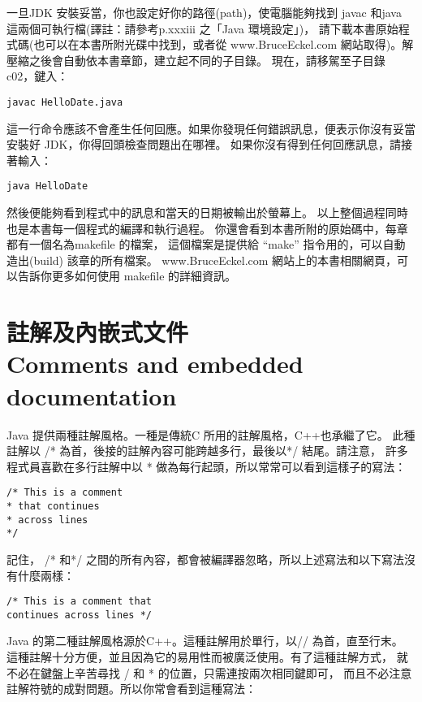 一旦JDK 安裝妥當，你也設定好你的路徑(path)，使電腦能夠找到
javac 和java 這兩個可執行檔(譯註：請參考p.xxxiii 之「Java 環境設定」)，
請下載本書原始程式碼(也可以在本書所附光碟中找到，或者從
www.BruceEckel.com 網站取得)。解壓縮之後會自動依本書章節，建立起不同的子目錄。
現在，請移駕至子目錄 c02，鍵入：

\begin{Verbatim}[frame=single]
javac HelloDate.java
\end{Verbatim}

這一行命令應該不會產生任何回應。如果你發現任何錯誤訊息，便表示你沒有妥當安裝好
JDK，你得回頭檢查問題出在哪裡。
如果你沒有得到任何回應訊息，請接著輸入：

\begin{Verbatim}[frame=single]
java HelloDate
\end{Verbatim}

然後便能夠看到程式中的訊息和當天的日期被輸出於螢幕上。
以上整個過程同時也是本書每一個程式的編譯和執行過程。
你還會看到本書所附的原始碼中，每章都有一個名為makefile 的檔案，
這個檔案是提供給 ``make'' 指令用的，可以自動造出(build) 該章的所有檔案。
www.BruceEckel.com 網站上的本書相關網頁，可以告訴你更多如何使用
makefile 的詳細資訊。

\section{註解及內嵌式文件 \\
Comments and embedded documentation}

Java 提供兩種註解風格。一種是傳統C 所用的註解風格，C++也承繼了它。
此種註解以 /* 為首，後接的註解內容可能跨越多行，最後以*/ 結尾。請注意，
許多程式員喜歡在多行註解中以 * 做為每行起頭，所以常常可以看到這樣子的寫法：

\begin{Verbatim}[frame=single]
/* This is a comment
* that continues
* across lines
*/
\end{Verbatim}


記住，
/* 和*/ 之間的所有內容，都會被編譯器忽略，所以上述寫法和以下寫法沒有什麼兩樣：

\begin{Verbatim}[frame=single]
/* This is a comment that
continues across lines */
\end{Verbatim}

Java 的第二種註解風格源於C++。這種註解用於單行，以// 為首，直至行末。
這種註解十分方便，並且因為它的易用性而被廣泛使用。有了這種註解方式，
就不必在鍵盤上辛苦尋找 / 和 * 的位置，只需連按兩次相同鍵即可，
而且不必注意註解符號的成對問題。所以你常會看到這種寫法：

